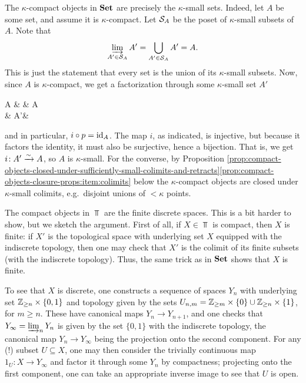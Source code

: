 \begin{example}\label{example:compact-objects-in-Set}
	The \(\kappa\)-compact objects in \(\Set\) are precisely the \(\kappa\)-small sets. Indeed, let \(A\) be some set, and assume it is \(\kappa\)-compact. Let \(\calS_A\) be the poset of
	\(\kappa\)-small subsets of \(A\). Note that
	\[ \injlim_{A'\in\calS_A}{A'} = \bigcup_{A'\in\calS_A} A' = A. \]
	This is just the statement that every set is the union of its \(\kappa\)-small subsets. Now, since \(A\) is \(\kappa\)-compact, we get a factorization through some \(\kappa\)-small set \(A'\)
	\begin{diagram*}
		A \ar[rr,equal]\ar[dr,dashed,"p"'] & & A\\
		& A'\ar[ur,hook,"i"'] &
	\end{diagram*}
	and in particular, \(i\circ p = \id_A\). The map \(i\), as indicated, is injective, but because it factors the identity, it must also be surjective, hence a bijection.
	That is, we get \(i\!:A'\iso A\), so \(A\) is \(\kappa\)-small. For the converse, by Proposition \ref{prop:compact-objects-closed-under-sufficiently-small-colimits-and-retracts}\ref{prop:compact-objects-closure-props:item:colimits}
	below the \(\kappa\)-compact objects are closed under \(\kappa\)-small colimits, e.g.\ disjoint unions of \(<\kappa\) points.
\end{example}
\begin{example}
	The compact objects in \(\Top\) are the finite discrete spaces. This is a bit harder to show, but we sketch the argument. First of all, if \(X\in\Top\) is compact,
	then \(X\) is finite: if \(X'\) is the topological space with underlying set \(X\) equipped with the indiscrete topology, then one may check that \(X'\) is the colimit
	of its finite subsets (with the indiscrete topology). Thus, the same trick as in \(\Set\) shows that \(X\) is finite. 

	To see that \(X\) is discrete, one constructs a sequence of spaces \(Y_n\) with underlying set \(\Z_{\geq n}\times\{0,1\}\) and topology given by the sets \(U_{n,m} = \Z_{\geq m}\times\{0\}\cup\Z_{\geq n}\times\{1\}\),
	for \(m\geq n\). These have canonical maps \(Y_{n}\to Y_{n+1}\), and one checks that \(Y_{\infty} = \injlim_nY_n\) is given by the set \(\{0,1\}\) with the indiscrete topology, the canonical map \(Y_n\to Y_{\infty}\) being
	the projection onto the second component. For any (!) subset \(U\subseteq X\), one may then consider the trivially continuous map \(1_U\!:X\to Y_{\infty}\) and factor it through some \(Y_n\) by compactness;
	projecting onto the first component, one can take an appropriate inverse image to see that \(U\) is open.
\end{example}
